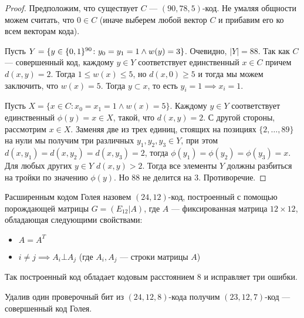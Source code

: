 \begin{proof}
Предположим, что существует $C$ --- $(90,78,5)$-код. Не умаляя общности 
можем считать, что $0 \in C$ (иначе выберем любой вектор $C$ и прибавим его
ко всем векторам кода). 

Пусть $Y = \{y \in \{0,1\}^{90} \colon y_0 = y_1 = 1 \land w(y) = 3 \}$. Очевидно,
$|Y| = 88$. Так как $C$ --- совершенный код, каждому $y \in Y$ соответствует
единственный $x \in C$ причем $d(x,y) = 2$. Тогда $1 \le w(x) \le 5$, но
$d(x,0) \ge 5$ и тогда мы можем заключить, что $w(x) = 5$. Тогда $y \subset x$,
то есть $y_i = 1 \implies x_i = 1$.

Пусть $X = \{x \in C \colon x_0 = x_1 = 1 \land w(x) = 5\}$. Каждому $y \in Y$ 
соответствует единственный $\phi(y) = x \in X$, такой, что $d(x,y) = 2$. С другой стороны,
рассмотрим $x\in X$. Заменяя две из трех единиц, стоящих на позициях 
$\{2, \ldots, 89\}$ на нули мы получим три различных $y_1, y_2, y_3 \in Y$,
при этом $d(x, y_1) = d(x, y_2) = d(x, y_3) = 2$, тогда 
$\phi(y_1) = \phi(y_2) = \phi(y_3) = x$. Для любых других $y \in Y$ 
$d(x,y) > 2$. Тогда все элементы $Y$ должны разбиться на тройки по значению
$\phi(y)$. Но $88$ не делится на $3$. Противоречие.
\end{proof}
\newpage
\begin{definition}
Расширенным кодом Голея назовем $(24,12)$-код, построенный с помощью 
порождающей матрицы $G = (E_{12} | A)$, где $A$ --- фиксированная матрица
$12 \times 12$, обладающая следующими свойствами:
\begin{itemize}
\item $A = A^{T}$
\item $i \neq j \implies A_i \bot A_j$ (где $A_i, A_j$ --- строки матрицы $A$)
\end{itemize}

\end{definition}

\begin{proposition}
Так построенный код обладает кодовым расстоянием $8$ и исправляет три ошибки.
\end{proposition}

\begin{remark}
Удалив один проверочный бит из $(24,12,8)$-кода получим $(23,12,7)$-код ---
совершенный код Голея.
\end{remark}


